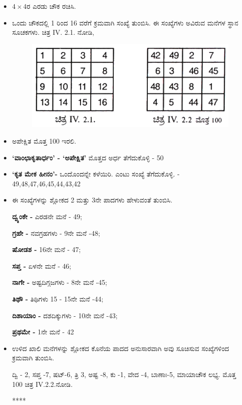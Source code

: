 \begin{itemize}
	\item $4 \times 4$ರ ಎರಡು ಚೌಕ ರಚಿಸಿ.
	\item ಒಂದು ಚೌಕದಲ್ಲಿ 1 ರಿಂದ 16 ವರೆಗೆ ಕ್ರಮವಾಗಿ ಸಂಖ್ಯೆ ತುಂಬಿಸಿ. ಈ ಸಂಖ್ಯೆಗಳು ಅವಿರುವ ಮನೆಗಳ ಸ್ಥಾನ ಸೂಚಕಗಳು. ಚಿತ್ರ IV. 2.1. ನೋಡಿ,
	\begin{figure}[H]
	\includegraphics{src/figures/chap3/fig3-40.jpg}
	\end{figure}
	\item ಅಪೇಕ್ಷಿತ ಮೊತ್ತ 100 ಇರಲಿ.
	\item \textbf{‘ವಾಂಛಾಕೃತಾರ್ಧಂ’ - ‘ಅಪೇಕ್ಷಿತ’} ಮೊತ್ತದ ಅರ್ಧ ತೆಗೆದುಕೊಳ್ಳಿ - 50
	\item \textbf{‘ಕೃತ ಮೇಕ ಹೀನಂ’-} ಒಂದೊಂದನ್ನೇ ಕಳೆಯಿರಿ. ಎಂಟು ಸಂಖ್ಯೆ ತೆಗೆದುಕೊಳ್ಳಿ. - 49,48,47,46,45,44,43,42
	\item ಈ ಸಂಖ್ಯೆಗಳನ್ನು ಶ್ಲೋಕದ 2 ಮತ್ತು 3ನೇ ಪಾದಗಳು ಹೇಳುವಂತೆ ತುಂಬಿಸಿ.

	\textbf{ದ್ವ್ಯಂಕೇ - }ಎರಡನೇ ಮನೆ - 49;

	\textbf{ಗ್ರಹೇ -} ನವಗ್ರಹಗಳು - 9ನೇ ಮನೆ -48;

	\textbf{ಷೋಡಶ -} 16ನೇ ಮನೆ - 47;

	\textbf{ಸಪ್ತ -} ಏಳನೇ ಮನೆ - 46;

	\textbf{ನಾಗೇ -} ಅಷ್ಟದಿಗ್ಗಜಗಳು - 8ನೇ ಮನೆ -45;

	\textbf{ತಿಥೌ -} ತಿಥಿಗಳು 15 - 15ನೇ ಮನೆ -44;

	\textbf{ದಿಶಾಯಾಂ -} ದಶದಿಕ್ಕುಗಳು - 10ನೇ ಮನೆ -43;

	\textbf{ಪ್ರಥಮೇ -} 1ನೇ ಮನೆ - 42

	\item ಉಳಿದ ಖಾಲಿ ಮನೆಗಳನ್ನು ಶ್ಲೋಕದ ಕೊನೆಯ ಪಾದದ ಅನುಸಾರವಾಗಿ ಅವು ಸೂಚಿಸುವ ಸಂಖ್ಯೆಗಳಿಂದ ಕ್ರಮವಾಗಿ ತುಂಬಿಸಿ.

	ದ್ವಿ  - 2, ಸಪ್ತ -7, ಷಟ್-6,  ತ್ರಿ 3, ಅಷ್ಟ -8, ಕು -1, ವೇದ -4, ಬಾಣಾಃ-5, ಮಾಯಾಚೌಕ ಲಭ್ಯ. ಮೊತ್ತ 100 ಚಿತ್ರ IV.2.2.ನೋಡಿ.
	\begin{center}
	****
	\end{center}
\end{itemize}

